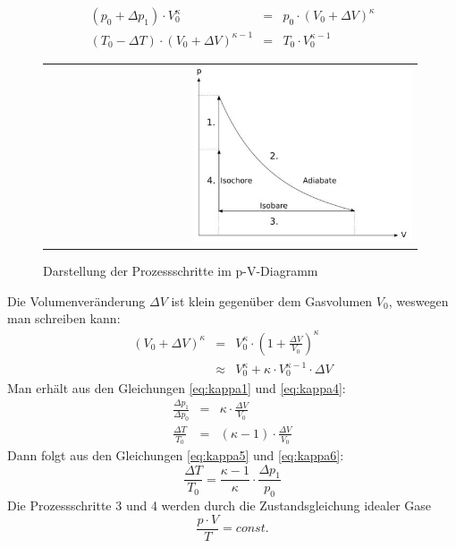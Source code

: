 \documentclass[a4paper,titlepage]{scrartcl}
\numberwithin{equation}{section}
\begin{document}
\begin{eqnarray}
(p_0+\Delta p_1) \cdot V_0^{\kappa} &=& p_0 \cdot (V_0+\Delta V)^\kappa\label{eq:kappa1}\\
(T_0-\Delta T) \cdot (V_0+\Delta V)^{\kappa - 1} &=& T_0 \cdot V_0^{\kappa-1}\label{eq:kappa2}
\end{eqnarray}
\begin{figure}[H]
	\centering
	\begin{tabular}{@{}r@{}}
		\includegraphics[width=0.6\textwidth]{bilder/prozessschritte.JPG}\\
	\end{tabular}
	\caption{Darstellung der Prozessschritte im p-V-Diagramm}
	\label{fig:prozessschritte}
\end{figure}
Die Volumenveränderung $\Delta V$ ist klein gegenüber dem Gasvolumen $V_0$, weswegen man schreiben kann:
\begin{eqnarray}
(V_0+ \Delta V)^{\kappa}&=&V_0^{\kappa} \cdot \left(1 + \frac{\Delta
 V}{V_0}\right)^{\kappa}\label{eq:kappa3}\\
 &\approx&V_0^{\kappa}+\kappa \cdot V_0^{\kappa-1} \cdot \Delta V\label{eq:kappa4}
\end{eqnarray}
Man erhält aus den Gleichungen \ref{eq:kappa1} und \ref{eq:kappa4}:
\begin{eqnarray}
\frac{\Delta p_1}{\Delta p_0}&=&\kappa \cdot \frac{\Delta V}{V_0}\label{eq:kappa5}\\
\frac{\Delta T}{T_0}&=&(\kappa - 1) \cdot \frac{\Delta V}{V_0}\label{eq:kappa6}
\end{eqnarray}
Dann folgt aus den Gleichungen \ref{eq:kappa5} und \ref{eq:kappa6}:
\begin{equation}
\label{eq:kappa7}
\frac{\Delta T}{T_0}=\frac{\kappa - 1}{\kappa} \cdot \frac{\Delta p_1}{p_0}
\end{equation}
Die Prozessschritte 3 und 4 werden durch die Zustandsgleichung idealer Gase
\begin{equation*}
\frac{p \cdot V}{T} = const.
\end{equation*}
\end{document}

